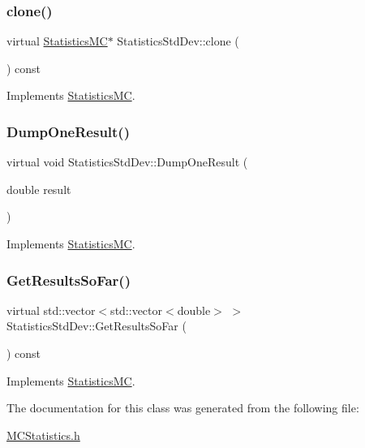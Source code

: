 \subsubsection{\texorpdfstring{clone()}{clone()}}
{\footnotesize\ttfamily virtual \hyperlink{classStatisticsMC}{Statistics\+MC}$\ast$ Statistics\+Std\+Dev\+::clone (\begin{DoxyParamCaption}{ }\end{DoxyParamCaption}) const\hspace{0.3cm}{\ttfamily [virtual]}}



Implements \hyperlink{classStatisticsMC_af716d17e088d36f283e112ba736f8002}{Statistics\+MC}.

\hypertarget{classStatisticsStdDev_a824017c76562426a4fd640ef8a909a5e}{}\label{classStatisticsStdDev_a824017c76562426a4fd640ef8a909a5e} 
\subsubsection{\texorpdfstring{Dump\+One\+Result()}{DumpOneResult()}}
{\footnotesize\ttfamily virtual void Statistics\+Std\+Dev\+::\+Dump\+One\+Result (\begin{DoxyParamCaption}\item[{double}]{result }\end{DoxyParamCaption})\hspace{0.3cm}{\ttfamily [virtual]}}



Implements \hyperlink{classStatisticsMC_a3ab5fb27d6933d8e35b2a55c3897cbe3}{Statistics\+MC}.

\hypertarget{classStatisticsStdDev_aacb0a24c646c6c664cadbca82c2ddfdd}{}\label{classStatisticsStdDev_aacb0a24c646c6c664cadbca82c2ddfdd} 
\subsubsection{\texorpdfstring{Get\+Results\+So\+Far()}{GetResultsSoFar()}}
{\footnotesize\ttfamily virtual std\+::vector$<$std\+::vector$<$double$>$ $>$ Statistics\+Std\+Dev\+::\+Get\+Results\+So\+Far (\begin{DoxyParamCaption}{ }\end{DoxyParamCaption}) const\hspace{0.3cm}{\ttfamily [virtual]}}



Implements \hyperlink{classStatisticsMC_ae29a294b6db36c2bf46c20ac30e25aad}{Statistics\+MC}.



The documentation for this class was generated from the following file\+:\begin{DoxyCompactItemize}
\item 
\hyperlink{MCStatistics_8h}{M\+C\+Statistics.\+h}\end{DoxyCompactItemize}
